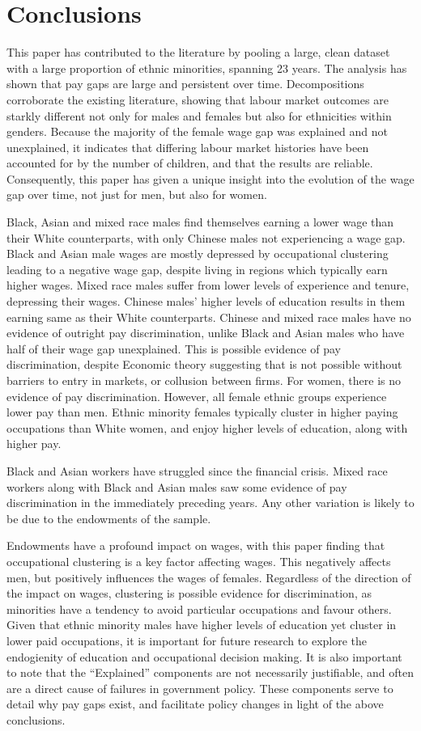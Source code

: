 \documentclass[class=article, crop=false]{standalone}
\begin{document}
\section{Conclusions}
\label{sec:Conclusions}
This paper has contributed to the literature by pooling a large, clean dataset with a large proportion of ethnic minorities, spanning 23 years. The analysis has shown that pay gaps are large and persistent over time. Decompositions corroborate the existing literature, showing that labour market outcomes are starkly different not only for males and females but also for ethnicities within genders. Because the majority of the female wage gap was explained and not unexplained, it indicates that differing labour market histories have been accounted for by the number of children, and that the results are reliable. Consequently, this paper has given a unique insight into the evolution of the wage gap over time, not just for men, but also for women.

Black, Asian and mixed race males find themselves earning a lower wage than their White counterparts, with only Chinese males not experiencing a wage gap. Black and Asian male wages are mostly depressed by occupational clustering leading to a negative wage gap, despite living in regions which typically earn higher wages. Mixed race males suffer from lower levels of experience and tenure, depressing their wages. Chinese males' higher levels of education results in them earning same as their White counterparts. Chinese and mixed race males have no evidence of outright pay discrimination, unlike Black and Asian males who have half of their wage gap unexplained. This is possible evidence of pay discrimination, despite Economic theory suggesting that is not possible without barriers to entry in markets, or collusion between firms. For women, there is no evidence of pay discrimination. However, all female ethnic groups experience lower pay than men. Ethnic minority females typically cluster in higher paying occupations than White women, and enjoy higher levels of education, along with higher pay.

Black and Asian workers have struggled since the financial crisis. Mixed race workers along with Black and Asian males saw some evidence of pay discrimination in the immediately preceding years. Any other variation is likely to be due to the endowments of the sample.

Endowments have a profound impact on wages, with this paper finding that occupational clustering is a key factor affecting wages. This negatively affects men, but positively influences the wages of females. Regardless of the direction of the impact on wages, clustering is possible evidence for discrimination, as minorities have a tendency to avoid particular occupations and favour others. Given that ethnic minority males have higher levels of education yet cluster in lower paid occupations, it is important for future research to explore the endogienity of education and occupational decision making. It is also important to note that the \enquote{Explained} components are not necessarily justifiable, and often are a direct cause of failures in government policy. These components serve to detail why pay gaps exist, and facilitate policy changes in light of the above conclusions.
\end{document}
